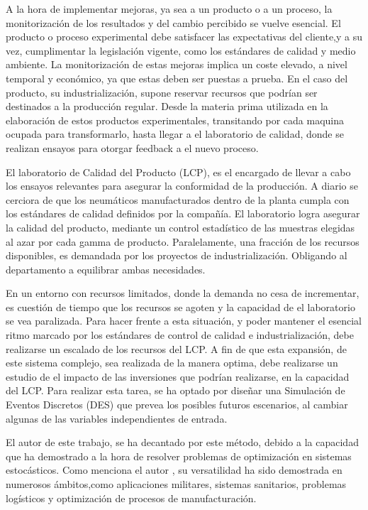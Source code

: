 A la hora de implementar mejoras, ya sea a un producto o a un proceso,
la monitorización de los resultados y del cambio percibido se vuelve esencial.
El producto o proceso experimental debe satisfacer las expectativas del cliente,y a su vez, cumplimentar la legislación vigente,
como los estándares de calidad y medio ambiente.
La monitorización de estas mejoras implica un coste elevado,
a nivel temporal y económico, ya que estas deben ser puestas a prueba.
En el caso del producto, su industrialización,
supone reservar recursos que podrían ser destinados a la producción regular.
Desde la materia prima utilizada
en la elaboración de estos productos experimentales,
transitando por cada maquina ocupada para transformarlo,
hasta llegar a el laboratorio de calidad,
donde se realizan ensayos para otorgar feedback a el nuevo proceso.

El laboratorio de Calidad del Producto (LCP),
es el encargado de llevar a cabo los ensayos relevantes
para asegurar la conformidad de la producción.
A diario se cerciora de que los neumáticos manufacturados dentro de la planta
cumpla con los estándares de calidad definidos por la compañía.
El laboratorio logra asegurar la calidad del producto,
mediante un control estadístico de las muestras
elegidas al azar por cada gamma de producto.
Paralelamente, una fracción de los recursos disponibles,
es demandada por los proyectos de industrialización.
Obligando al departamento a equilibrar ambas necesidades.

En un entorno con recursos limitados,
donde la demanda no cesa de incrementar,
es cuestión de tiempo que los recursos se agoten
y la capacidad de el laboratorio se vea paralizada.
Para hacer frente a esta situación,
y poder mantener el esencial ritmo
marcado por los estándares de control de calidad e industrialización,
debe realizarse un escalado de los recursos del LCP.
A fin de que esta expansión, de este sistema complejo,
sea realizada de la manera optima,
debe realizarse un estudio de el impacto
de las inversiones que podrían realizarse, en la capacidad del LCP.
Para realizar esta tarea,
se ha optado por diseñar una Simulación de Eventos Discretos (DES)
que prevea los posibles futuros escenarios,
al cambiar algunas de las variables independientes de entrada.

El autor de este trabajo, se ha decantado por este método,
debido a la capacidad que ha demostrado
a la hora de resolver problemas de optimización en sistemas estocásticos.
Como menciona el autor \citep{allen2011introduction},
su versatilidad ha sido demostrada en numerosos ámbitos,como
aplicaciones militares,
sistemas sanitarios,
problemas logísticos
y optimización de procesos de manufacturación.

